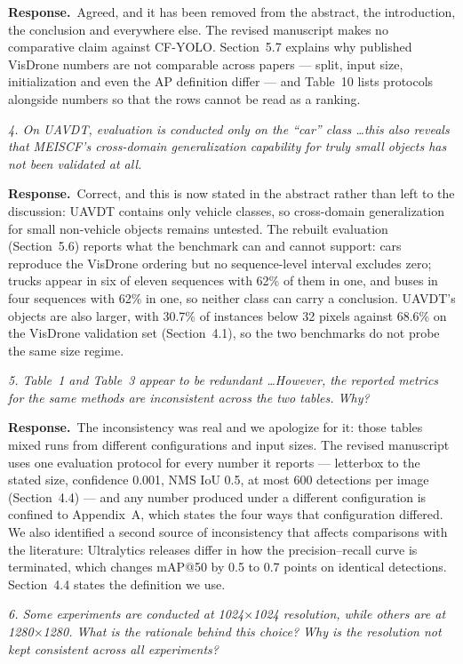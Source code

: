 \documentclass[11pt, a4paper]{article}
\newcommand{\point}[1]{\medskip\noindent\textit{#1}\par}
\newcommand{\reply}{\textbf{Response.}\ }
\begin{document}
\reply Agreed, and it has been removed from the abstract, the introduction, the
conclusion and everywhere else. The revised manuscript makes no comparative claim
against CF-YOLO. Section~5.7 explains why published VisDrone numbers are not
comparable across papers --- split, input size, initialization and even the AP
definition differ --- and Table~10 lists protocols alongside numbers so that the
rows cannot be read as a ranking.

\point{4. On UAVDT, evaluation is conducted only on the ``car'' class \dots this
also reveals that MEISCF's cross-domain generalization capability for truly small
objects has not been validated at all.}

\reply Correct, and this is now stated in the abstract rather than left to the
discussion: UAVDT contains only vehicle classes, so cross-domain generalization
for small non-vehicle objects remains untested. The rebuilt evaluation
(Section~5.6) reports what the benchmark can and cannot support: cars reproduce
the VisDrone ordering but no sequence-level interval excludes zero; trucks appear
in six of eleven sequences with 62\% of them in one, and buses in four sequences
with 62\% in one, so neither class can carry a conclusion. UAVDT's objects are also
larger, with 30.7\% of instances below 32 pixels against 68.6\% on the VisDrone
validation set (Section~4.1), so the two benchmarks do not probe the same size
regime.

\point{5. Table~1 and Table~3 appear to be redundant \dots However, the reported
metrics for the same methods are inconsistent across the two tables. Why?}

\reply The inconsistency was real and we apologize for it: those tables mixed runs
from different configurations and input sizes. The revised manuscript uses one
evaluation protocol for every number it reports --- letterbox to the stated size,
confidence 0.001, NMS IoU 0.5, at most 600 detections per image (Section~4.4) ---
and any number produced under a different configuration is confined to
Appendix~A, which states the four ways that configuration differed. We also
identified a second source of inconsistency that affects comparisons with the
literature: Ultralytics releases differ in how the precision--recall curve is
terminated, which changes mAP@50 by 0.5 to 0.7 points on identical detections.
Section~4.4 states the definition we use.

\point{6. Some experiments are conducted at 1024$\times$1024 resolution, while
others are at 1280$\times$1280. What is the rationale behind this choice? Why is
the resolution not kept consistent across all experiments?}
\end{document}
